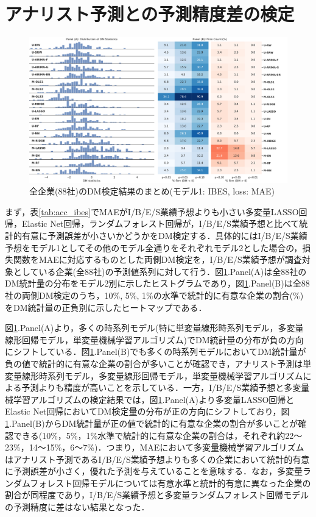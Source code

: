\documentclass[a4paper，12pt]{jsarticle}
\begin{document}
\section{アナリスト予測との予測精度差の検定}

\begin{figure}
  \centering
  \caption{全企業(88社)のDM検定結果のまとめ(モデル1: IBES, loss: MAE)}
  \label{fig:dm_ibes_mad}
  \includegraphics[width=15cm]{./img/_dm_MAD_y_hat_ibes.pdf}
\end{figure}

まず，表\ref{tab:acc_ibes}でMAEがI/B/E/S業績予想よりも小さい多変量LASSO回帰，Elastic Net回帰，ランダムフォレスト回帰が，I/B/E/S業績予想と比べて統計的有意に予測誤差が小さいかどうかをDM検定する．具体的にはI/B/E/S業績予想をモデル1としてその他のモデル全通りをそれぞれモデル2とした場合の，損失関数をMAEに対応するものとした両側DM検定を，I/B/E/S業績予想が調査対象としている企業(全88社)の予測値系列に対して行う．図\ref{fig:dm_ibes_mad}.Panel(A)は全88社のDM統計量の分布をモデル2別に示したヒストグラムであり，図\ref{fig:dm_ibes_mad}.Panel(B)は全88社の両側DM検定のうち，10\%, 5\%, 1\%の水準で統計的に有意な企業の割合(\%)をDM統計量の正負別に示したヒートマップである．

図\ref{fig:dm_ibes_mad}.Panel(A)より，多くの時系列モデル(特に単変量線形時系列モデル，多変量線形回帰モデル，単変量機械学習アルゴリズム)でDM統計量の分布が負の方向にシフトしている．図\ref{fig:dm_ibes_mad}.Panel(B)でも多くの時系列モデルにおいてDM統計量が負の値で統計的に有意な企業の割合が多いことが確認でき，アナリスト予測は単変量線形時系列モデル，多変量線形回帰モデル，単変量機械学習アルゴリズムによる予測よりも精度が高いことを示している．一方，I/B/E/S業績予想と多変量械学習アルゴリズムの検定結果では，図\ref{fig:dm_ibes_mad}.Panel(A)より多変量LASSO回帰とElastic Net回帰においてDM検定量の分布が正の方向にシフトしており，図\ref{fig:dm_ibes_mad}.Panel(B)からDM統計量が正の値で統計的に有意な企業の割合が多いことが確認できる(10\%，5\%，1\%水準で統計的に有意な企業の割合は，それぞれ約22～23\%，14～15\%，6～7\%)．つまり，MAEにおいて多変量機械学習アルゴリズムはアナリスト予測であるI/B/E/S業績予想よりも多くの企業において統計的有意に予測誤差が小さく，優れた予測を与えていることを意味する．なお，多変量ランダムフォレスト回帰モデルについては有意水準と統計的有意に異なった企業の割合が同程度であり，I/B/E/S業績予想と多変量ランダムフォレスト回帰モデルの予測精度に差はない結果となった．
\end{document}
